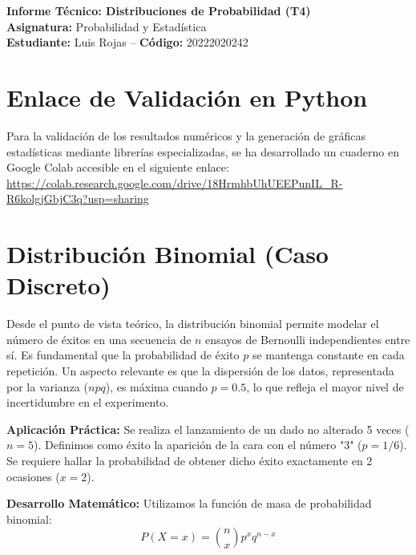 \documentclass[12pt,a4paper]{article}
\begin{document}
\begin{center}
    \textbf{\Large Informe Técnico: Distribuciones de Probabilidad (T4)} \\
    \vspace{0.3cm}
    \textbf{Asignatura:} Probabilidad y Estadística \\
    \textbf{Estudiante:} Luis Rojas -- \textbf{Código:} 20222020242 \\
    \vspace{0.8cm}
\end{center}

\section*{Enlace de Validación en Python}
Para la validación de los resultados numéricos y la generación de gráficas estadísticas mediante librerías especializadas, se ha desarrollado un cuaderno en Google Colab accesible en el siguiente enlace: \\
\url{https://colab.research.google.com/drive/18HrmhbUhUEEPunIL_R-R6kolgjGbjC3q?usp=sharing}

\vspace{0.6cm}

\section{Distribución Binomial (Caso Discreto)}

Desde el punto de vista teórico, la distribución binomial permite modelar el número de éxitos en una secuencia de $n$ ensayos de Bernoulli independientes entre sí. Es fundamental que la probabilidad de éxito $p$ se mantenga constante en cada repetición. Un aspecto relevante es que la dispersión de los datos, representada por la varianza ($npq$), es máxima cuando $p = 0.5$, lo que refleja el mayor nivel de incertidumbre en el experimento.

\vspace{0.4cm}
\textbf{Aplicación Práctica:} 
Se realiza el lanzamiento de un dado no alterado 5 veces ($n=5$). Definimos como éxito la aparición de la cara con el número "3" ($p=1/6$). Se requiere hallar la probabilidad de obtener dicho éxito exactamente en 2 ocasiones ($x=2$).

\vspace{0.4cm}
\textbf{Desarrollo Matemático:}
Utilizamos la función de masa de probabilidad binomial:
\[ P(X=x) = \binom{n}{x} p^x q^{n-x} \]
\end{document}
